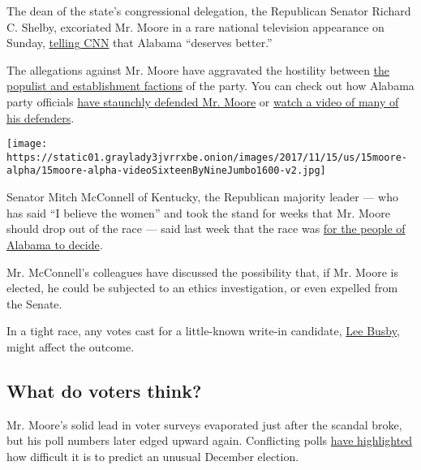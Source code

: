 The dean of the state's congressional delegation, the Republican Senator
Richard C. Shelby, excoriated Mr. Moore in a rare national television
appearance on Sunday,
\href{http://www.cnn.com/2017/12/10/politics/richard-shelby-roy-moore-sotu-cnntv/index.html}{telling
CNN} that Alabama ``deserves better.''

The allegations against Mr. Moore have aggravated the hostility between
\href{https://www.nytimes3xbfgragh.onion/2017/11/16/us/politics/republican-party-division-roy-moore.html}{the
populist and establishment factions} of the party. You can check out how
Alabama party officials
\href{https://www.nytimes3xbfgragh.onion/2017/11/10/us/politics/roy-moore-alabama-republicans.html}{have
staunchly defended Mr. Moore} or
\href{https://www.nytimes3xbfgragh.onion/video/us/politics/100000005552332/roy-moore-and-his-supporters-fire-back-on-misconduct-accusations.html}{watch
a video of many of his defenders}.

\texttt{[image: https://static01.graylady3jvrrxbe.onion/images/2017/11/15/us/15moore-alpha/15moore-alpha-videoSixteenByNineJumbo1600-v2.jpg]}

Senator Mitch McConnell of Kentucky, the Republican majority leader ---
who has said ``I believe the women'' and took the stand for weeks that
Mr. Moore should drop out of the race --- said last week that the race
was
\href{https://www.nytimes3xbfgragh.onion/2017/12/03/us/politics/mitch-mcconnell-roy-moore.html}{for
the people of Alabama to decide}.

Mr. McConnell's colleagues have discussed the possibility that, if Mr.
Moore is elected, he could be subjected to an ethics investigation, or
even expelled from the Senate.

In a tight race, any votes cast for a little-known write-in candidate,
\href{https://www.politico.com/story/2017/11/28/lee-busby-alabama-senate-race-spoiler-261775}{Lee
Busby}, might affect the outcome.

\hypertarget{what-do-voters-think}{%
\subsection{What do voters think?}\label{what-do-voters-think}}

Mr. Moore's solid lead in voter surveys evaporated just after the
scandal broke, but his poll numbers later edged upward again.
Conflicting polls
\href{https://www.nytimes3xbfgragh.onion/2017/12/11/us/alabama-roy-moore-doug-jones.html}{have
highlighted} how difficult it is to predict an unusual December
election.

